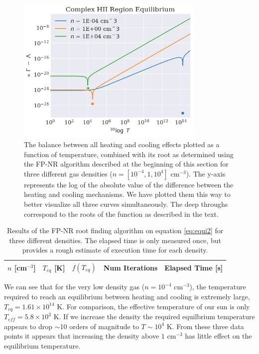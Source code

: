 \begin{figure}
    \centering
    \includegraphics[width=0.8\textwidth]{results/complex_hiiregion_roots.png}
    \caption{The balance between all heating and cooling effects plotted as a function of temperature, combined with its root as determined using the FP-NR algorithm described at the beginning of this section for three different gas densities ($n = [10^{-4}, 1, 10^4]$ cm$^{-3}$). The y-axis represents the log of the absolute value of the difference between the heating and cooling mechanisms. We have plotted them this way to better visualize all three curves simultaneously. The deep throughs correspond to the roots of the function as described in the text.}
    \label{fig:complex_roots}
\end{figure}


\begin{table}[h]
    \centering
    \begin{tabular}{c|c|c|c|c}
        $n$ [cm$^{-3}$] & $T_{eq}$ [K] & $f(T_{eq})$ & Num Iterations & Elapsed Time [s] \\
        \hline
        
    \end{tabular}
    \caption{Results of the FP-NR root finding algorithm on equation \ref{eq:equi2} for three different densities. The elapsed time is only measured once, but provides a rough estimate of execution time for each density.}
    \label{tab:complex_roots}
\end{table}

We can see that for the very low density gas ($n=10^{-4}$ cm$^{-3}$), the temperature required to reach an equilibrium between heating and cooling is extremely large, $T_{eq} = 1.61\times 10^{14}$ K. For comparison, the effective temperature of our sun is only $T_{eff} = 5.8 \times 10^3$ K. If we increase the density the required equilbrium temperature appears to drop $\sim$10 orders of magnitude to $T \sim 10^4$ K. From these three data points it appears that increasing the density above $1$ cm$^{-3}$ has little effect on the equilibrium temperature.


